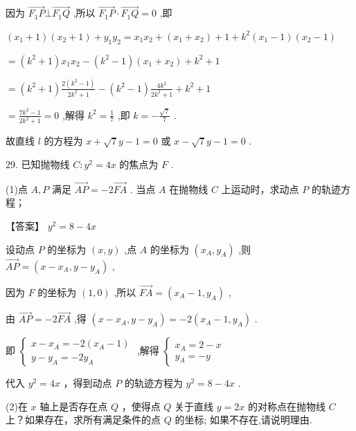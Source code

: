 \documentclass[10pt]{article}
\begin{document}
因为 \(\overrightarrow{{F}_{1}P} \bot  \overrightarrow{{F}_{1}Q}\) ,所以 \(\overrightarrow{{F}_{1}P} \cdot  \overrightarrow{{F}_{1}Q} = 0\) ,即

\(\left( {{x}_{1} + 1}\right) \left( {{x}_{2} + 1}\right)  + {y}_{1}{y}_{2} = {x}_{1}{x}_{2} + \left( {{x}_{1} + {x}_{2}}\right)  + 1 + {k}^{2}\left( {{x}_{1} - 1}\right) \left( {{x}_{2} - 1}\right)\)

\(= \left( {{k}^{2} + 1}\right) {x}_{1}{x}_{2} - \left( {{k}^{2} - 1}\right) \left( {{x}_{1} + {x}_{2}}\right)  + {k}^{2} + 1\)

\(= \left( {{k}^{2} + 1}\right) \frac{2\left( {{k}^{2} - 1}\right) }{2{k}^{2} + 1} - \left( {{k}^{2} - 1}\right) \frac{4{k}^{2}}{2{k}^{2} + 1} + {k}^{2} + 1\)

\(= \frac{7{k}^{2} - 1}{2{k}^{2} + 1} = 0\) ,解得 \({k}^{2} = \frac{1}{7}\) ,即 \(k =  - \frac{\sqrt{7}}{7}\) .

故直线 \(l\) 的方程为 \(x + \sqrt{7}y - 1 = 0\) 或 \(x - \sqrt{7}y - 1 = 0\) .

29. 已知抛物线 \(C : {y}^{2} = {4x}\) 的焦点为 \(F\) .

(1)点 \(A,P\) 满足 \(\overrightarrow{AP} =  - 2\overrightarrow{FA}\) . 当点 \(A\) 在抛物线 \(C\) 上运动时，求动点 \(P\) 的轨迹方程；

【答案】 \({y}^{2} = 8 - {4x}\)

设动点 \(P\) 的坐标为 \(\left( {x,y}\right)\) ,点 \(A\) 的坐标为 \(\left( {{x}_{A},{y}_{A}}\right)\) ,则 \(\overrightarrow{AP} = \left( {x - {x}_{A},y - {y}_{A}}\right)\) ,

因为 \(F\) 的坐标为 \(\left( {1,0}\right)\) ,所以 \(\overrightarrow{FA} = \left( {{x}_{A} - 1,{y}_{A}}\right)\) ,

由 \(\overrightarrow{AP} =  - 2\overrightarrow{FA}\) ,得 \(\left( {x - {x}_{A},y - {y}_{A}}\right)  =  - 2\left( {{x}_{A} - 1,{y}_{A}}\right)\) .

即 \(\left\{  \begin{array}{l} x - {x}_{A} =  - 2\left( {{x}_{A} - 1}\right) \\  y - {y}_{A} =  - 2{y}_{A} \end{array}\right.\) ,解得 \(\left\{  \begin{array}{l} {x}_{A} = 2 - x \\  {y}_{A} =  - y \end{array}\right.\)

代入 \({y}^{2} = {4x}\) ，得到动点 \(P\) 的轨迹方程为 \({y}^{2} = 8 - {4x}\) .

(2)在 \(x\) 轴上是否存在点 \(Q\) ，使得点 \(Q\) 关于直线 \(y = {2x}\) 的对称点在抛物线 \(C\) 上？如果存在，求所有满足条件的点 \(Q\) 的坐标; 如果不存在,请说明理由.
\end{document}
